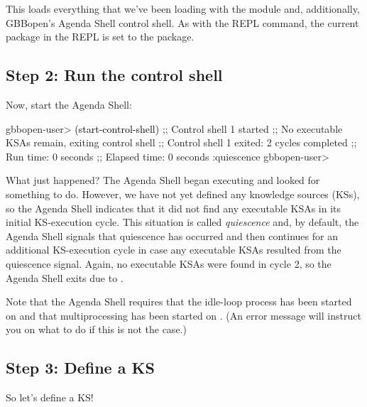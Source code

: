 \documentclass[10pt,twoside,english,pdftex]{article}
\begin{document}
This loads everything that we've been loading with the
 module and, additionally, GBBopen's Agenda Shell
control shell. As with the  REPL command, the current
package in the REPL is set to the  package.

\subsection*{Step 2: Run the control shell}

%
%
Now, start the Agenda Shell:
%
\W\supp
\begin{example}
\textcolor{darkergray}{%
  gbbopen-user> \textcolor{black}{(start-control-shell)}
  ;; Control shell 1 started
  ;; No executable KSAs remain, exiting control shell
  ;; Control shell 1 exited: 2 cycles completed
  ;; Run time: 0 seconds
  ;; Elapsed time: 0 seconds
  :quiescence
  gbbopen-user>}
\end{example}

%
%
%
%
%
What just happened?  The Agenda Shell began executing and looked for something
to do.  However, we have not yet defined any knowledge sources (KSs), so the
Agenda Shell indicates that it did not find any executable KSAs in its initial
KS-execution cycle.  This situation is called \textit{quiescence} and, by
default, the Agenda Shell signals that quiescence has occurred and then
continues for an additional KS-execution cycle in case any executable KSAs
resulted from the quiescence signal.  Again, no executable KSAs were found in
cycle 2, so the Agenda Shell exits due to .

Note that the Agenda Shell requires that the idle-loop process has been
started on  and that
multiprocessing has been started on
.  (An error message will
instruct you on what to do if this is not the case.)

\subsection*{Step 3: Define a KS}

So let's define a KS!
\end{document}
